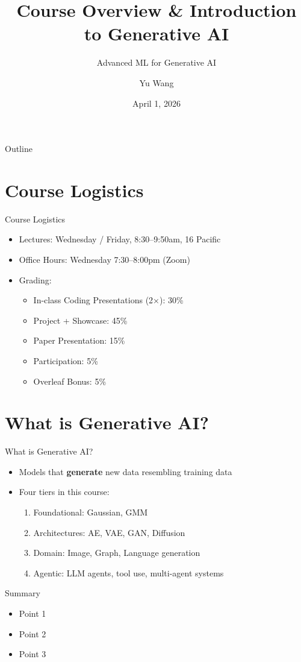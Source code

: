 \documentclass[aspectratio=169]{beamer}
\title{Course Overview \& Introduction to Generative AI}
\subtitle{Advanced ML for Generative AI}
\author{Yu Wang}
\institute{Department of Computer Science \\ University of Oregon}
\date{April 1, 2026}
\begin{document}
\begin{frame}
  \titlepage
\end{frame}

\begin{frame}{Outline}
  \tableofcontents
\end{frame}

\section{Course Logistics}

\begin{frame}{Course Logistics}
  \begin{itemize}
    \item Lectures: Wednesday / Friday, 8:30--9:50am, 16 Pacific
    \item Office Hours: Wednesday 7:30--8:00pm (Zoom)
    \item Grading:
    \begin{itemize}
      \item In-class Coding Presentations (2×): 30\%
      \item Project + Showcase: 45\%
      \item Paper Presentation: 15\%
      \item Participation: 5\%
      \item Overleaf Bonus: 5\%
    \end{itemize}
  \end{itemize}
\end{frame}

\section{What is Generative AI?}

\begin{frame}{What is Generative AI?}
  \begin{itemize}
    \item Models that \textbf{generate} new data resembling training data
    \item Four tiers in this course:
    \begin{enumerate}
      \item Foundational: Gaussian, GMM
      \item Architectures: AE, VAE, GAN, Diffusion
      \item Domain: Image, Graph, Language generation
      \item Agentic: LLM agents, tool use, multi-agent systems
    \end{enumerate}
  \end{itemize}
\end{frame}


\begin{frame}{Summary}
  \begin{itemize}
    \item[$\bullet$] Point 1
    \item[$\bullet$] Point 2
    \item[$\bullet$] Point 3
  \end{itemize}
\end{frame}
\end{document}
